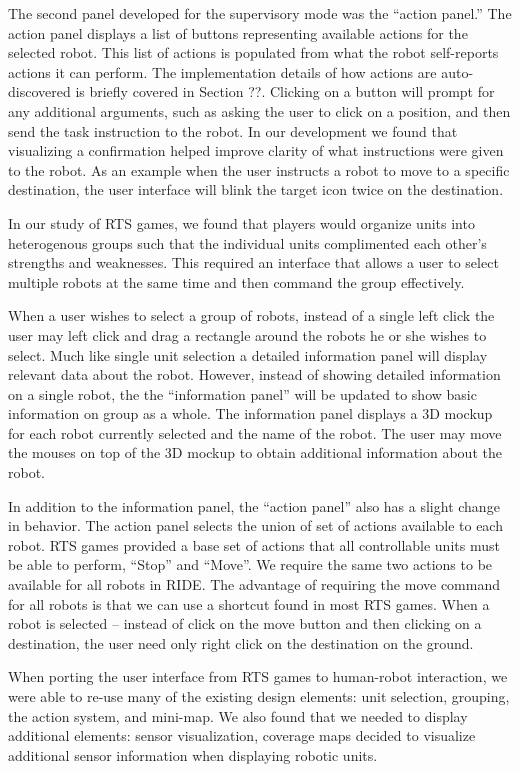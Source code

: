 The second panel developed for the supervisory mode was the ``action panel.'' The action panel displays a list of buttons representing available actions for the selected robot. This list of actions is populated from what the robot self-reports actions it can perform. The implementation details of how actions are auto-discovered is briefly covered in Section ??. Clicking on a button will prompt for any additional arguments, such as asking the user to click on a position, and then send the task instruction to the robot. In our development we found that visualizing a confirmation helped improve clarity of what instructions were given to the robot. As an example when the user instructs a robot to move to a specific destination, the user interface will blink the target icon twice on the destination.  

In our study of RTS games, we found that players would organize units into heterogenous groups such that the individual units complimented each other's strengths and weaknesses. This required an interface that allows a user to select multiple robots at the same time and then command the group effectively.

When a user wishes to select a group of robots, instead of a single left click the user may left click and drag a rectangle around the robots he or she wishes to select. Much like single unit selection a detailed information panel will display relevant data about the robot. However, instead of showing detailed information on a single robot, the the ``information panel'' will be updated to show basic information on group as a whole. The information panel displays a 3D mockup for each robot currently selected and the name of the robot. The user may move the mouses on top of the 3D mockup to obtain additional information about the robot.

In addition to the information panel, the ``action panel'' also has a slight change in behavior. The action panel selects the union of set of actions available to each robot. RTS games provided a base set of actions that all controllable units must be able to perform, ``Stop'' and ``Move''. We require the same two actions to be available for all robots in RIDE. The advantage of requiring the move command for all robots is that we can use a shortcut found in most RTS games. When a robot is selected -- instead of click on the move button and then clicking on a destination, the user need only right click on the destination on the ground.

When porting the user interface from RTS games to human-robot interaction, we were able to re-use many of the existing design elements: unit selection, grouping, the action system, and mini-map. We also found that we needed to display additional elements: sensor visualization, coverage maps  decided to visualize additional sensor information when displaying robotic units. 


